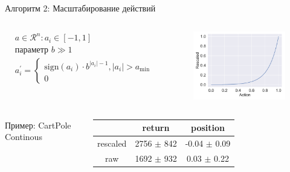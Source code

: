 \setcounter{footnote}{0} 
\begin{frame}{Алгоритм 2: Масштабирование действий\footnotemark}

\vspace{-20pt}
\begin{minipage}{\linewidth}
\begin{columns}
\begin{align*}
& a \in \mathcal{R}^n: a_i \in [-1, 1] \\
& \text{параметр } b \gg 1\\ 
& a_i^{\prime} =
   \begin{cases}
    {\mathrm{sign}}(a_i) \cdot b^{|a_i| - 1}, |a_i| > a_{\min}
    \\
    0
  \end{cases}
\end{align*}

\begin{figure}
    \centering
    \includegraphics[width=1\linewidth]{images/rescale.pdf}
\end{figure}

\end{columns}
\end{minipage}

\vspace{-10pt}
\begin{minipage}{\linewidth}
\begin{columns}
\centering Пример: CartPole Continous
\vspace{5pt}
    \begin{tabular}{c|c|c}
         & return & position \\ 
         \hline
         rescaled &  2756 $\pm$ 842 & -0.04 $\pm$ 0.09\\
         raw & 1692 $\pm$ 932 & 0.03 $\pm$ 0.22 
    \end{tabular}


\end{columns}
\end{minipage}
\end{frame}
